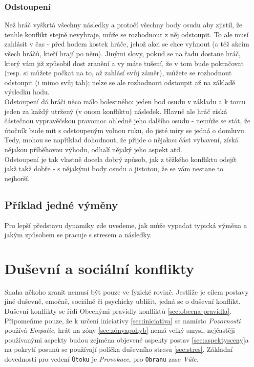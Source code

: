\subsubsection{Odstoupení}
\label{sec:odstoupeni}

Než hráč vyškrtá všechny následky a protočí všechny body osudu aby zjistil, že tenhle konflikt stejně nevyhraje, může se rozhodnout z něj odstoupit. To ale musí zahlásit v čas - před hodem kostek hráče, jehož akci se chce vyhnout (a též akcím všech hráčů, kteří hrají po něm). Jinými slovy, pokud se na řadu dostane hráč, který vám již způsobil dost zranění a vy máte tušení, že v tom bude pokračovat (resp. si můžete počkat na to, až zahlásí svůj záměr), můžete se rozhodnout odstoupit (i mimo svůj tah); nelze se ale rozhodnout odstoupit až na základě výsledku hodu.\\
Odstoupení dá hráči něco málo bolestného: jeden bod osudu v základu a k tomu jeden za každý utržený (v onom konfliktu) následek. Hlavně ale hráč získá částečnou vypravěčskou pravomoc ohledně jeho dalšího osudu - nemůže se stát, že útočník bude mít s odstoupeným volnou ruku, do jisté míry se jedná o domluvu. Tedy, mohou se například dohodnout, že přijde o nějakou část vybavení, získá nějakou příběhovou výhodu, odhalí nějaký jeho aspekt atd. \\
Odstoupení je tak vlastně docela dobrý způsob, jak z těžkého konfliktu odejít jakž takž dobře - s nějakými body osudu a jistotou, že se vám nestane to nejhorší. 

\subsection{Příklad jedné výměny}
\label{sec:priklad-vymena}

Pro lepší představu dynamiky zde uvedeme, jak může vypadat typická výměna a jakým způsobem se pracuje s stresem a následky.

\section{Duševní a sociální konflikty}
\label{sec:dusevni-soc-konflikty}

Snaha někoho zranit nemusí být pouze ve fyzické rovině. Jestliže je cílem postavy jiné duševně, emočně, sociálně či psychicky ublížit, jedná se o duševní konflikt. \\
Duševní konflikty se řídí Obecnými pravidly konfliktů \ref{sec:obecna-pravidla}. Připomeňme pouze, že k určení iniciativy \ref{sec:iniciativa} se namísto \textit{Pozornosti} používá \textit{Empatie}, hrát na zóny \ref{sec:zónyapohyb} nemá velký smysl, nejčastěji používanými aspekty budou zejména objevené aspekty postav \ref{sec:aspektysceny}a na pokrytí posunů se používají políčka duševního stresu \ref{sec:stres}. Základní dovedností pro vedení \texttt{Útoku} je \textit{Provokace}, pro \texttt{Obranu} zase \textit{Vůle}.

